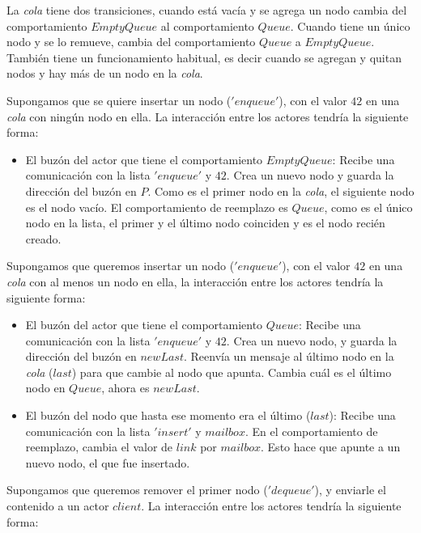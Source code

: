 La \textit{cola} tiene dos transiciones, cuando está vacía y se agrega un nodo cambia del comportamiento $EmptyQueue$ al comportamiento $Queue$. Cuando tiene un único nodo y se lo remueve, cambia del comportamiento $Queue$ a $EmptyQueue$. También tiene un funcionamiento habitual, es decir cuando se agregan y quitan nodos y hay más de un nodo en la \textit{cola}.

Supongamos que se quiere insertar un nodo ($'enqueue'$), con el valor $42$ en una \textit{cola} con ningún nodo en ella. La interacción entre los actores tendría la siguiente forma:

\begin{itemize}
 \item El buzón del actor que tiene el comportamiento $EmptyQueue$:
 \subitem Recibe una comunicación con la lista $'enqueue'$ y $42$.
 \subitem Crea un nuevo nodo y guarda la dirección del buzón en $P$.
 \subitem Como es el primer nodo en la \textit{cola}, el siguiente nodo es el nodo vacío.
 \subitem El comportamiento de reemplazo es $Queue$, como es el único nodo en la lista, el primer y el último nodo coinciden y es el nodo recién creado.
\end{itemize}

Supongamos que queremos insertar un nodo ($'enqueue'$), con el valor $42$ en una \textit{cola} con al menos un nodo en ella, la interacción entre los actores tendría la siguiente forma:

\begin{itemize}
 \item El buzón del actor que tiene el comportamiento $Queue$:
 \subitem Recibe una comunicación con la lista $'enqueue'$ y $42$.
 \subitem Crea un nuevo nodo, y guarda la dirección del buzón en $newLast$.
 \subitem Reenvía un mensaje al último nodo en la \textit{cola} ($last$) para que cambie al nodo que apunta.
 \subitem Cambia cuál es el último nodo en $Queue$, ahora es $newLast$.
 \item El buzón del nodo que hasta ese momento era el último ($last$):
 \subitem Recibe una comunicación con la lista $'insert'$ y $mailbox$.
 \subitem En el comportamiento de reemplazo, cambia el valor de $link$ por $mailbox$. Esto hace que apunte a un nuevo nodo, el que fue insertado.
\end{itemize}

Supongamos que queremos remover el primer nodo ($'dequeue'$), y enviarle el contenido a un actor $client$. La interacción entre los actores tendría la siguiente forma:

